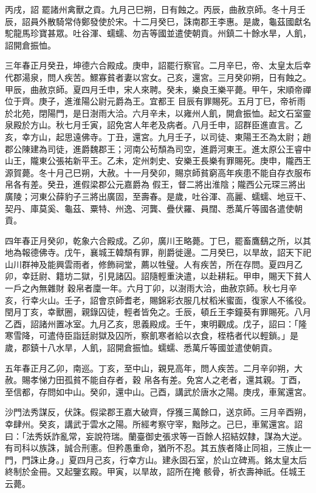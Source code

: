 \begin{pinyinscope}
 丙戌，詔
 罷諸州禽獸之貢。九月己巳朔，日有蝕之。丙辰，曲赦京師。冬十月壬辰，詔員外散騎常侍鄭發使於宋。十二月癸巳，誅南郡王李惠。是歲，龜茲國獻名駝龍馬珍寶甚眾。吐谷渾、蠕蠕、勿吉等國並遣使朝貢。州鎮二十餘水旱，人飢，詔開倉振恤。



 三年春正月癸丑，坤德六合殿成。庚申，詔罷行察官。二月辛巳，帝、太皇太后幸代郡湯泉，問人疾苦。鰥寡貧者妻以宮女。己亥，還宮。三月癸卯朔，日有蝕之。甲辰，曲赦京師。夏四月壬申，宋人來聘。癸未，樂良王樂平薨。甲午，宋順帝禪位于齊。庚子，進淮陽公尉元爵為王。宜都王
 目辰有罪賜死。五月丁巳，帝祈雨於北苑，閉陽門，是日澍雨大洽。六月辛未，以雍州人飢，開倉振恤。起文石室靈泉殿於方山。秋七月壬寅，詔免宮人年老及病者。八月壬申，詔群臣進直言。乙亥，幸方山，起思遠佛寺。丁丑，還宮。九月壬子，以司徒、東陽王丕為太尉；趙郡公陳建為司徒，進爵魏郡王；河南公茍頹為司空，進爵河東王。進太原公王睿中山王，隴東公張祐新平王。乙未，定州刺史、安樂王長樂有罪賜死。庚申，隴西王源賀薨。冬十月己巳朔，大赦。十一月癸卯，賜京師貧窮高年疾患不能自存衣服布帛各有差。癸丑，進假梁郡公元嘉爵為
 假王，督二將出淮陰；隴西公元琛三將出廣陵；河東公薛豹子三將出廣固，至壽春。是歲，吐谷渾、高麗、蠕蠕、地豆干、契丹、庫莫奚、龜茲、粟特、州逸、河龔、疊伏羅、員闊、悉萬斤等國各遣使朝貢。



 四年春正月癸卯，乾象六合殿成。乙卯，廣川王略薨。丁巳，罷畜鷹鷂之所，以其地為報德佛寺。戊午，襄城王韓頹有罪，削爵徙邊。二月癸巳，以旱故，詔天下祀山川群神及能興雲雨者，修飾祠堂，薦以牲璧。人有疾苦，所在存問。夏四月乙卯，幸廷尉、籍坊二獄，引見諸囚。詔隨輕重決遣，以赴耕耘。甲申，賜天下貧人一戶之內無雜財
 穀帛者廩一年。六月丁卯，以澍雨大洽，曲赦京師。秋七月辛亥，行幸火山。壬子，詔會京師耆老，賜錦彩衣服几杖稻米蜜面，復家人不徭役。閏月丁亥，幸獸圈，親錄囚徒，輕者皆免之。壬辰，頓丘王李鐘葵有罪賜死。八月乙酉，詔諸州置冰室。九月乙亥，思義殿成。壬午，東明觀成。戊子，詔曰：「隆寒雪降，可遣侍臣詣廷尉獄及囚所，察飢寒者給以衣食，桎梏者代以輕鎖。」是歲，郡鎮十八水旱，人飢，詔開倉振恤。蠕蠕、悉萬斤等國並遣使朝貢。



 五年春正月乙卯，南巡。丁亥，至中山，親見高年，問人疾苦。二月辛卯朔，大赦。賜孝悌力田孤貧不能自存者，穀
 帛各有差。免宮人之老者，還其親。丁酉，至信都，存問如中山。癸卯，還中山。己酉，講武於唐水之陽。庚戌，車駕還宮。



 沙門法秀謀反，伏誅。假梁郡王嘉大破齊，俘獲三萬餘口，送京師。三月辛酉朔，幸肆州。癸亥，講武于雲水之陽。所經考察守宰，黜陟之。己巳，車駕還宮。詔曰：「法秀妖詐亂常，妄說符瑞。蘭臺御史張求等一百餘人招結奴隸，謀為大逆。有司科以族誅，誠合刑憲。但矜愚重命，猶所不忍。其五族者降止同祖，三族止一門，門誅止身。」夏四月己亥，行幸方山。建永固石室，於山立碑焉。銘太皇太后終制於金冊。又起鑒玄殿。甲寅，以旱故，詔所在掩
 骸骨，祈衣壽神祇。任城王云薨。




\end{pinyinscope}
